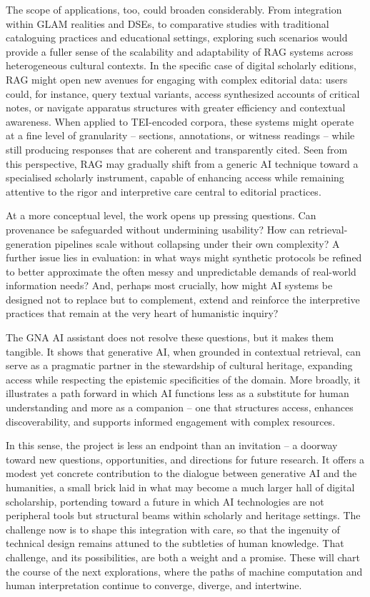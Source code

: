 \begin{spacing}{1.5}
The scope of applications, too, could broaden considerably. From integration within GLAM realities and DSEs, to comparative studies with traditional cataloguing practices and educational settings, exploring such scenarios would provide a fuller sense of the scalability and adaptability of RAG systems across heterogeneous cultural contexts. In the specific case of digital scholarly editions, RAG might open new avenues for engaging with complex editorial data: users could, for instance, query textual variants, access synthesized accounts of critical notes, or navigate apparatus structures with greater efficiency and contextual awareness. When applied to TEI-encoded corpora, these systems might operate at a fine level of granularity -- sections, annotations, or witness readings -- while still producing responses that are coherent and transparently cited. Seen from this perspective, RAG may gradually shift from a generic AI technique toward a specialised scholarly instrument, capable of enhancing access while remaining attentive to the rigor and interpretive care central to editorial practices.

At a more conceptual level, the work opens up pressing questions. Can provenance be safeguarded without undermining usability? How can retrieval-generation pipelines scale without collapsing under their own complexity? A further issue lies in evaluation: in what ways might synthetic protocols be refined to better approximate the often messy and unpredictable demands of real-world information needs? And, perhaps most crucially, how might AI systems be designed not to replace but to complement, extend and reinforce the interpretive practices that remain at the very heart of humanistic inquiry?

The GNA AI assistant does not resolve these questions, but it makes them tangible. It shows that generative AI, when grounded in contextual retrieval, can serve as a pragmatic partner in the stewardship of cultural heritage, expanding access while respecting the epistemic specificities of the domain. More broadly, it illustrates a path forward in which AI functions less as a substitute for human understanding and more as a companion -- one that structures access, enhances discoverability, and supports informed engagement with complex resources.

In this sense, the project is less an endpoint than an invitation -- a doorway toward new questions, opportunities, and directions for future research. It offers a modest yet concrete contribution to the dialogue between generative AI and the humanities, a small brick laid in what may become a much larger hall of digital scholarship, portending toward a future in which AI technologies are not peripheral tools but structural beams within scholarly and heritage settings. The challenge now is to shape this integration with care, so that the ingenuity of technical design remains attuned to the subtleties of human knowledge. That challenge, and its possibilities, are both a weight and a promise. These will chart the course of the next explorations, where the paths of machine computation and human interpretation continue to converge, diverge, and intertwine.


\end{spacing}